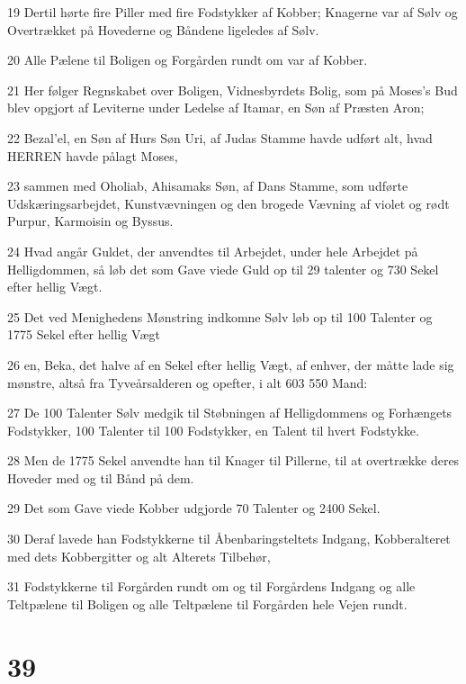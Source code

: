 \par 19 Dertil hørte fire Piller med fire Fodstykker af Kobber; Knagerne var af Sølv og Overtrækket på Hovederne og Båndene ligeledes af Sølv.
\par 20 Alle Pælene til Boligen og Forgården rundt om var af Kobber.
\par 21 Her følger Regnskabet over Boligen, Vidnesbyrdets Bolig, som på Moses's Bud blev opgjort af Leviterne under Ledelse af Itamar, en Søn af Præsten Aron;
\par 22 Bezal'el, en Søn af Hurs Søn Uri, af Judas Stamme havde udført alt, hvad HERREN havde pålagt Moses,
\par 23 sammen med Oholiab, Ahisamaks Søn, af Dans Stamme, som udførte Udskæringsarbejdet, Kunstvævningen og den brogede Vævning af violet og rødt Purpur, Karmoisin og Byssus.
\par 24 Hvad angår Guldet, der anvendtes til Arbejdet, under hele Arbejdet på Helligdommen, så løb det som Gave viede Guld op til 29 talenter og 730 Sekel efter hellig Vægt.
\par 25 Det ved Menighedens Mønstring indkomne Sølv løb op til 100 Talenter og 1775 Sekel efter hellig Vægt
\par 26 en, Beka, det halve af en Sekel efter hellig Vægt, af enhver, der måtte lade sig mønstre, altså fra Tyveårsalderen og opefter, i alt 603 550 Mand:
\par 27 De 100 Talenter Sølv medgik til Støbningen af Helligdommens og Forhængets Fodstykker, 100 Talenter til 100 Fodstykker, en Talent til hvert Fodstykke.
\par 28 Men de 1775 Sekel anvendte han til Knager til Pillerne, til at overtrække deres Hoveder med og til Bånd på dem.
\par 29 Det som Gave viede Kobber udgjorde 70 Talenter og 2400 Sekel.
\par 30 Deraf lavede han Fodstykkerne til Åbenbaringsteltets Indgang, Kobberalteret med dets Kobbergitter og alt Alterets Tilbehør,
\par 31 Fodstykkerne til Forgården rundt om og til Forgårdens Indgang og alle Teltpælene til Boligen og alle Teltpælene til Forgården hele Vejen rundt.

\chapter{39}

